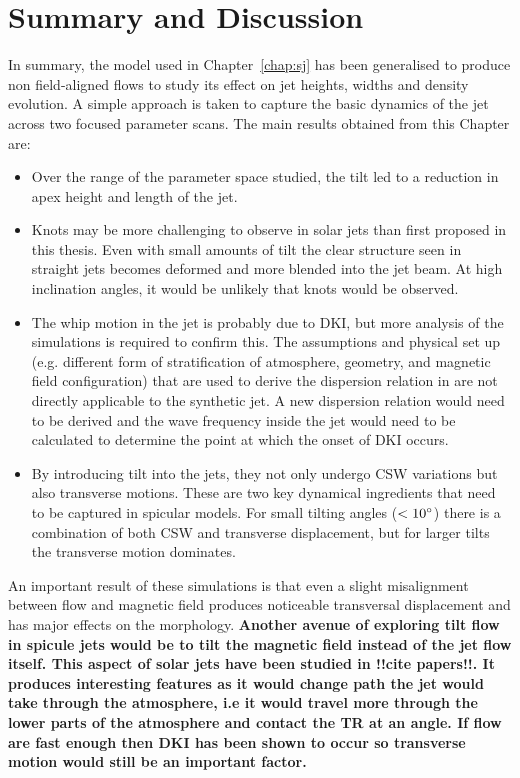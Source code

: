 \section{Summary and Discussion}
\label{sec:sum}
In summary, the model used in Chapter~\ref{chap:sj} has been generalised to produce non field-aligned flows to study its effect on jet heights, widths and density evolution. A simple approach is taken to capture the basic dynamics of the jet across two focused parameter scans. The main results obtained from this Chapter are:   
\begin{itemize}
\item Over the range of the parameter space studied, the tilt led to a reduction in apex height and length of the jet.
\item Knots may be more challenging to observe in solar jets than first proposed in this thesis. Even with small amounts of tilt the clear structure seen in straight jets becomes deformed and more blended into the jet beam. At high inclination angles, it would be unlikely that knots would be observed. 
\item The whip motion in the jet is probably due to DKI, but more analysis of the simulations is required to confirm this. The assumptions and physical set up (e.g. different form of stratification of atmosphere, geometry, and magnetic field configuration) that are used to derive the dispersion relation in \cite{Zaqarashvili2020ApJ893L46Z} are not directly applicable to the synthetic jet. A new dispersion relation would need to be derived and the wave frequency inside the jet would need to be calculated to determine the point at which the onset of DKI occurs. 
\item By introducing tilt into the jets, they not only undergo CSW variations but also transverse motions. These are two key dynamical ingredients that need to be captured in spicular models. For small tilting angles ($<10^{\circ}$) there is a combination of both CSW and transverse displacement, but for larger tilts the transverse motion dominates.
\end{itemize}
An important result of these simulations is that even a slight misalignment between flow and magnetic field produces noticeable transversal displacement and has major effects on the morphology. \textbf{Another avenue of exploring tilt flow in spicule jets would be to tilt the magnetic field instead of the jet flow itself. This aspect of solar jets have been studied in !!cite papers!!. It produces interesting features as it would change path the jet would take through the atmosphere, i.e it would travel more through the lower parts of the atmosphere and contact the TR at an angle. If flow are fast enough then DKI has been shown to occur so transverse motion would still be an important factor.}\np
